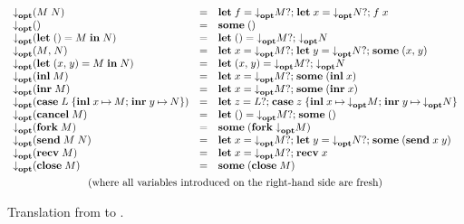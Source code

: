 \begin{figure*}
\begin{mdframed}
\begin{highlight}
\[\begin{array}{lcl}
        \atm{\parens{\gvApp{M}{N}}}
        & = & \gvDo{f}{\atm{M}}{{\gvDo{x}{\atm{N}}{\gvApp{f}{x}}}}
        \\
        \atm{\gvUnit}
        & = & \gvSome{\gvUnit}
        \\
        \atm{\parens{\gvLetUnit{M}{N}}}
        & = & \gvDo{\gvUnit}{\atm{M}}{{\atm{N}}}
        \\
        \atm{\gvPair{M}{N}}
        & = & \gvDo{x}{\atm{M}}{{\gvDo{y}{\atm{N}}{{\gvSome{\gvPair{x}{y}}}}}}
        \\
        \atm{\parens{\gvLetPair{x}{y}{M}{N}}}
        & = & \gvDo{\gvPair{x}{y}}{\atm{M}}{\atm{N}}
        \\
        \atm{\parens{\gvInl{M}}}
        & = & \gvDo{x}{\atm{M}}{\gvSome{\parens{\gvInl{x}}}}
        \\
        \atm{\parens{\gvInr{M}}}
        & = & \gvDo{x}{\atm{M}}{\gvSome{\parens{\gvInr{x}}}}
        \\
        \atm{\parens{\gvCaseSum{L}{x}{M}{y}{N}}}
        & = & \gvDo{z}{L}{{\gvCaseSum{z}{x}{\atm{M}}{y}{\atm{N}}}}
        \\
        \atm{\parens{\gvCancel{M}}}
        & = & \gvDo{\gvUnit}{\atm{M}}{\gvSome{\gvUnit}}
        \\
        \atm{\parens{\gvFork{M}}}
        & = & \gvSome{\parens{\gvFork{\atm{M}}}}
        \\
        \atm{\parens{\gvSend{M}{N}}}
        & = & \gvDo{x}{\atm{M}}{{\gvDo{y}{\atm{N}}{\gvSome{\parens{\gvSend{x}{y}}}}}}
        \\
        \atm{\parens{\gvRecv{M}}}
        & = & \gvDo{x}{\atm{M}}{{\gvRecv{x}}}
        \\
        \atm{\parens{\gvClose{M}}}
        & = & \gvSome{\parens{\gvClose{M}}}
        \\[1ex]
        \multicolumn{3}{c}{%
        \text{(where all variables introduced on the right-hand side are fresh)}}
      \end{array}
    \]
  \end{highlight}\end{mdframed}
  \caption[\affineEGV to \affineAGV]{Translation from \affineEGV to \affineAGV.}
  \label{fig:affine-egv-to-agv}
\end{figure*}
